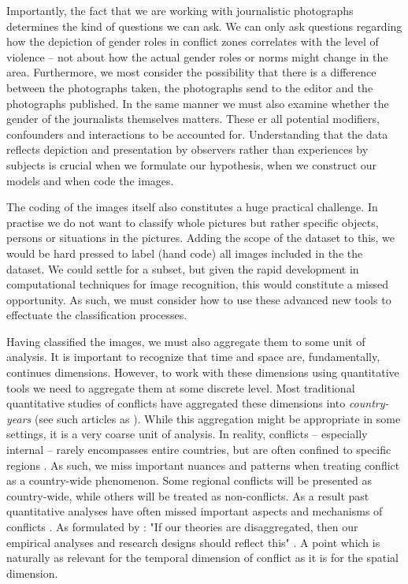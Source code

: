 \documentclass[a4paper]{article}
\begin{document}
Importantly, the fact that we are working with journalistic photographs determines the kind of questions we can ask. We can only ask questions regarding how the depiction of gender roles in conflict zones correlates with the level of violence -- not about how the actual gender roles or norms might change in the area. Furthermore, we most consider the possibility that there is a difference between the photographs taken, the photographs send to the editor and the photographs published. In the same manner we must also examine whether the gender of the journalists themselves matters. These er all potential modifiers, confounders and interactions to be accounted for. Understanding that the data reflects depiction and presentation by observers rather than experiences by subjects is crucial when we formulate our hypothesis, when we construct our models and when code the images.\par

The coding of the images itself also constitutes a huge practical challenge. In practise we do not want to classify whole pictures but rather specific objects, persons or situations in the pictures. Adding the scope of the dataset to this, we would be hard pressed to label (hand code) all images included in the the dataset. We could settle for a subset, but given the rapid development in computational techniques for image recognition, this would constitute a missed opportunity. As such, we must consider how to use these advanced new tools to effectuate the classification processes.\par 

Having classified the images, we must also aggregate them to some unit of analysis. It is important to recognize that time and space are, fundamentally, continues dimensions. However, to work with these dimensions using quantitative tools we need to aggregate them at some discrete level. Most traditional quantitative studies of conflicts have aggregated these dimensions into \emph{country-years} (see such articles as \cite{Collier_Hoeffler_1998, Fearon_Laitin_2003, Collier_Hoeffler_2004, Fearon_2004, Ross_2004, Fearon_2005, Hegre_Sambanis_2006, Goldstone_2010}). While this aggregation might be appropriate in some settings, it is a very coarse unit of analysis. In reality, conflicts -- especially internal -- rarely encompasses entire countries, but are often confined to specific regions \citep[487]{Cederman_Gleditsch_2009}. As such, we miss important nuances and patterns when treating conflict as a country-wide phenomenon. Some regional conflicts will be presented as country-wide, while others will be treated as non-conflicts. As a result past quantitative analyses have often missed important aspects and mechanisms of conflicts \citep{Cederman_Gleditsch_2009, Cederman_Gleditsch_Buhaug_2013}. As formulated by \cite{Cederman_Gleditsch_2009}: "If our theories are disaggregated, then our empirical analyses and research designs should reflect this" \citep[490]{Cederman_Gleditsch_2009}. A point which is naturally as relevant for the temporal dimension of conflict as it is for the spatial dimension.\par 
\end{document}
